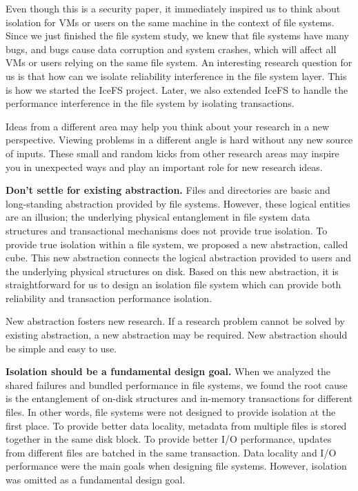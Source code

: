 Even though this is a security paper, it immediately inspired us to 
think about isolation for VMs or users on the same machine in the
context of file systems. Since we just finished the file system study,
we knew that file systems have many bugs, and bugs cause data
corruption and system crashes, which will affect all VMs or users
relying on the same file system. An interesting research question for
us is that how can we isolate reliability interference in the file
system layer. This is how we started the IceFS project.  Later, we
also extended IceFS to handle the performance interference in the file
system by isolating transactions. 

Ideas from a different area may help you think about your research in
a new perspective. Viewing problems in a different angle is hard
without any new source of inputs. These small and random kicks from
other research areas may inspire you in unexpected ways and play an
important role for new research ideas.  


\vspace{0.1in} \noindent \textbf{Don't settle for existing abstraction.}
Files and directories are basic and long-standing abstraction provided
by file systems.  However, these logical entities are an illusion; the
underlying physical entanglement in file system data structures and
transactional mechanisms does not provide true isolation. 
To provide true isolation within a file system, we proposed a new
abstraction, called cube.  This new abstraction connects the logical
abstraction provided to users and the underlying physical structures
on disk. Based on this new abstraction, it is straightforward for us
to design an isolation file system which can provide both reliability
and transaction performance isolation.  

New abstraction fosters new research. If a research problem cannot be 
solved by existing abstraction, a new abstraction may be required. 
New abstraction should be simple and easy to use. 

\vspace{0.1in} \noindent \textbf{Isolation should be a fundamental design goal.}
When we analyzed the shared failures and bundled performance in file
systems, we found the root cause is the entanglement of on-disk  
structures and in-memory transactions for different files. In other
words, file systems were not designed to provide isolation at the
first place.  To provide better data locality, metadata from multiple
files is stored together in the same disk block. To provide better I/O
performance, updates from different files are batched in the same
transaction. Data locality and I/O performance were the main goals
when designing file systems.  However, isolation was omitted as a
fundamental design goal. 

